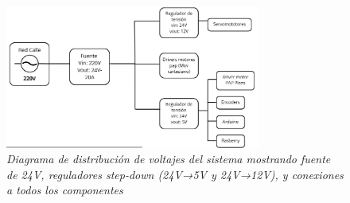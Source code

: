 \begin{figure}[H]
\centering
\includegraphics[width=0.75\textwidth]{img/diagrama_voltajes_real.png}
\caption{\textit{Diagrama de distribución de voltajes del sistema mostrando fuente de 24V, reguladores step-down (24V→5V y 24V→12V), y conexiones a todos los componentes}}
\label{fig:diagrama_voltajes}
\end{figure}
